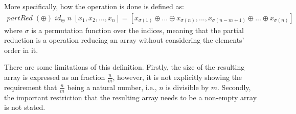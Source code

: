 \documentclass{l4proj}
\begin{document}
More specifically, how the operation is done is defined as:
\begin{align}
    partRed\; (\oplus)\; id_\oplus\; n\; [x_1, x_2, ... , x_n] =
    [x_{\sigma(1)} \oplus ... \oplus x_{\sigma(n)}, ... , x_{\sigma(n-m+1)} \oplus ... \oplus x_{\sigma(n)}]
\end{align}
where $\sigma$ is a permutation function over the indices, meaning that the partial reduction is a operation reducing an array without considering the elements' order in it.

There are some limitations of this definition. Firstly, the size of the resulting array is expressed as an fraction $\frac{n}{m}$, however, it is not explicitly showing the requirement that $\frac{n}{m}$ being a natural number, i.e., $n$ is divisible by $m$. Secondly, the important restriction that the resulting array needs to be a non-empty array is not stated.
\end{document}

